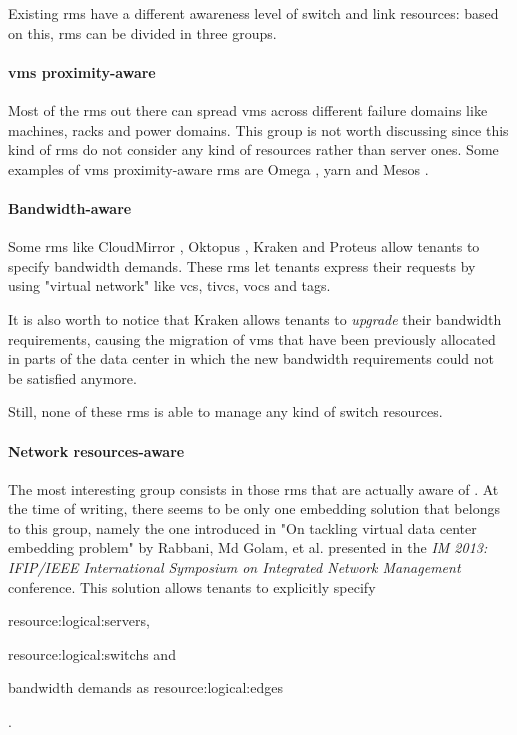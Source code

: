 Existing \glspl{rm} have a different awareness level of switch and link resources: based on this, \glspl{rm} can be divided in three groups.

\paragraph{\glspl{vm} proximity-aware}
Most of the \glspl{rm} out there can spread \glspl{vm} across different failure domains like machines, racks and power domains.
This group is not worth discussing since this kind of \glspl{rm} do not consider any kind of resources rather than server ones.
Some examples of \glspl{vm} proximity-aware \glspl{rm} are Omega \cite{omega}, \glsdesc{yarn} and Mesos \cite{mesos}.

\paragraph{Bandwidth-aware}
   
Some \glspl{rm} like CloudMirror \cite{cloudmirror}, Oktopus \cite{oktopus}, Kraken \cite{kraken} and Proteus \cite{proteus} allow tenants to specify bandwidth demands.
These \glspl{rm} let tenants express their requests by using "virtual network"  like \glspl{vc}, \glspl{tivc}, \glspl{voc} and \glspl{tag}.

It is also worth to notice that Kraken \cite{kraken} allows tenants to \textit{upgrade} their bandwidth requirements, causing the migration of \glspl{vm} that have been previously allocated in parts of the data center in which the new bandwidth requirements could not be satisfied anymore.

Still, none of these \glspl{rm} is able to manage any kind of switch resources.

\paragraph{Network resources-aware}
The most interesting group consists in those \glspl{rm} that are actually aware of .
At the time of writing, there seems to be only one embedding solution that belongs to this group, namely the one introduced in "On tackling virtual data center embedding problem" \cite{ontackling} by Rabbani, Md Golam, et al. presented in the \textit{IM 2013: IFIP/IEEE International Symposium on Integrated Network Management} conference.
This solution allows tenants to explicitly specify
\begin{mylist}
    \item \glspl{resource:logical:server},
    \item \glspl{resource:logical:switch} and
    \item bandwidth demands as \glspl{resource:logical:edge}
\end{mylist}.

